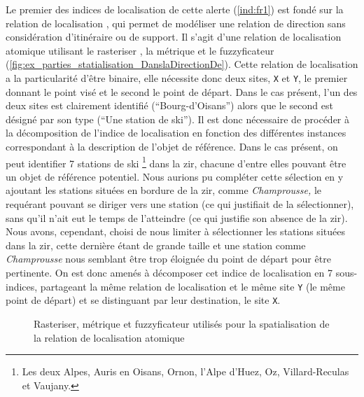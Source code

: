 Le premier des indices de localisation de cette alerte (\ref{ind:fr1})
est fondé sur la relation de localisation
, qui permet de
modéliser une relation de direction sans considération d'itinéraire ou
de support. Il s'agit d'une relation de localisation atomique
utilisant le rasteriser , la métrique
 et le fuzzyficateur
(\autoref{fig:ex_parties_statialisation_DanslaDirectionDe}). Cette
relation de localisation a la particularité d'être binaire, elle
nécessite donc deux sites, \texttt{X} et \texttt{Y}, le premier
donnant le point visé et le second le point de départ. Dans le cas
présent, l'un des deux sites est clairement identifié
(\enquote{Bourg-d'Oisans}) alors que le second est désigné par son
type (\enquote{Une station de ski}). Il est donc nécessaire de
procéder à la décomposition de l'indice de localisation en fonction
des différentes instances correspondant à la description de l'objet de
référence. Dans le cas présent, on peut identifier 7 stations de ski
\footnote{Les deux Alpes, Auris en Oisans, Ornon, l'Alpe d'Huez, Oz,
  Villard-Reculas et Vaujany.}  dans la \ac{zir}, chacune d'entre
elles pouvant être un objet de référence potentiel. Nous aurions pu
compléter cette sélection en y ajoutant les stations situées en
bordure de la \ac{zir}, comme \emph{Champrousse,} le requérant pouvant
se diriger vers une station (ce qui justifiait de la sélectionner),
sans qu'il n'ait eut le temps de l'atteindre (ce qui justifie son
absence de la \ac{zir}). Nous avons, cependant, choisi de nous limiter
à sélectionner les stations situées dans la \ac{zir}, cette dernière
étant de grande taille et une station comme \emph{Champrousse} nous
semblant être trop éloignée du point de départ pour être pertinente.
On est donc amenés à décomposer cet indice de localisation en 7
sous-indices, partageant la même relation de localisation et le même
site \texttt{Y} (\ie le même point de départ) et se distinguant par
leur destination, le site \texttt{X}.

\begin{figure}
  \centering
  
  \caption{Rasteriser, métrique et fuzzyficateur utilisés pour la
    spatialisation de la relation de localisation atomique
    \protect{}}
  \label{fig:ex_parties_statialisation_DanslaDirectionDe}
\end{figure}

